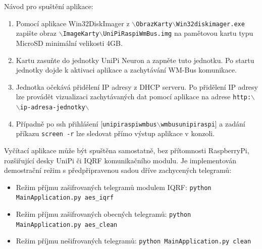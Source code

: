 Návod pro spuštění aplikace:
		\begin{enumerate}
			\item Pomocí aplikace Win32DiskImager z \texttt{$\backslash$ObrazKarty$\backslash$Win32diskimager.exe} zapište obraz \texttt{$\backslash$ImageKarty$\backslash$UniPiRaspiWmBus.img} na pamětovou kartu typu MicroSD minimální velikosti 4GB.
			\item Kartu zasuňte do jednotky UniPi Neuron a zapněte tuto jednotku. Po startu jednotky dojde k aktivaci aplikace a zachytávání WM-Bus komunikace.
			\item Jednotka očekává přidělení IP adresy z DHCP serveru. Po přidělení IP adresy lze provádět vizualizaci zachytávaných dat pomocí aplikace na adrese \texttt{http:$\backslash$$\backslash$ip-adresa-jednotky$\backslash$}
			\item Případně po ssh přihlášení [\texttt{unipiraspiwmbus$\backslash$wmbusunipiraspi}] a zadání příkazu \texttt{screen -r} lze sledovat přímo výstup aplikace v konzoli.
		\end{enumerate}

	\vspace{10pt}
Vyčítací aplikace může být spuštěna samostatně, bez přítomnosti RaspberryPi, rozšiřující desky UniPi či IQRF komunikačního modulu. Je implementován demostrační režim s předpřipravenou sadou dříve zachycených telegramů:
\begin{itemize}
	\item Režim příjmu zašifrovaných telegramů modulem IQRF: 
		\newline 
		\texttt{python MainApplication.py aes\_iqrf}
	\item Režim příjmu zašifrovaných obecných telegramů: 
		\newline 
		\texttt{python MainApplication.py aes\_clean}
	\item Režim příjmu nešifrovaných telegramů: 
		\newline 
		\texttt{python MainApplication.py clean}
\end{itemize}


